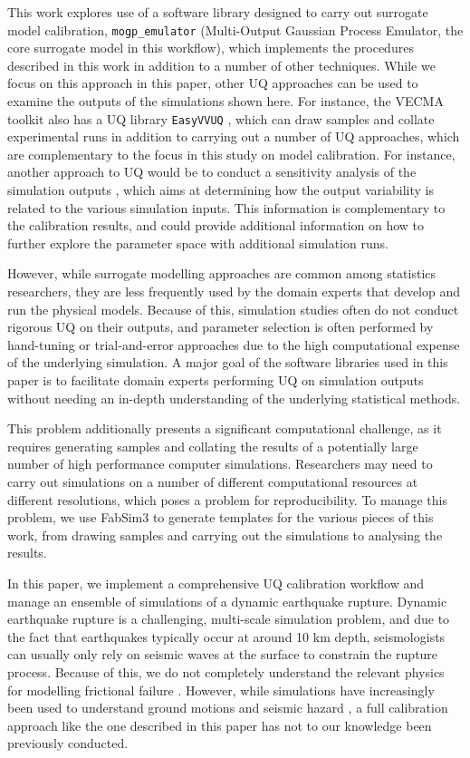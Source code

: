 \documentclass[openacc]{rstransa}%
\begin{document}
This work explores use of a software library designed to carry out surrogate model calibration,
\texttt{mogp\_emulator} (Multi-Output Gaussian Process Emulator, the core surrogate model
in this workflow), which implements the procedures described in this work in addition to a
number of other techniques. While we focus on this approach in this paper,
other UQ approaches can be used to examine the outputs of the simulations shown here.
For instance, the VECMA toolkit \cite{vecma-tk} also has a UQ library \texttt{EasyVVUQ}
\cite{easyvvuq}, which can
draw samples and collate experimental runs in addition to carrying out a number of
UQ approaches, which are complementary to the focus in this study on model calibration.
For instance, another approach to UQ would be to conduct a sensitivity analysis of the
simulation outputs \cite{sobol}, which aims at determining how the output variability is related to the
various simulation inputs. This information is complementary to the calibration results,
and could provide additional information on how to further explore the parameter space
with additional simulation runs.

However, while surrogate modelling approaches are common among statistics researchers, they are
less frequently used by the domain experts that develop and run the physical models. Because of this,
simulation studies often do not conduct rigorous UQ on their outputs, and parameter selection is
often performed by hand-tuning or trial-and-error approaches due to the high computational expense
of the underlying simulation. A major goal of the software libraries
used in this paper is to facilitate domain experts performing UQ on simulation outputs without
needing an in-depth understanding of the underlying statistical methods.

This problem additionally presents a significant computational challenge, as it requires generating samples
and collating the results of a potentially large number of high performance computer simulations.
Researchers may need to carry out simulations on a number of different computational resources at
different resolutions, which poses a problem for reproducibility. To manage this problem, we
use FabSim3 \cite{fabsim} to generate templates for the various pieces of this work, from drawing samples
and carrying out the simulations to analysing the results.

In this paper, we implement a comprehensive
UQ calibration workflow and manage an ensemble of simulations of a dynamic earthquake rupture.
Dynamic earthquake rupture is a challenging, multi-scale simulation problem, and due to the fact
that earthquakes typically occur at around 10 km depth, seismologists can usually only rely
on seismic waves at the surface to constrain the rupture process. Because of this, we do not
completely understand the relevant physics for modelling frictional failure \cite{daubcarlson}. However, while
simulations have increasingly been used to understand ground motions and seismic hazard \cite{terashake,m8}, a full
calibration approach like the one described in this paper has not to our knowledge been
previously conducted.
\end{document}

